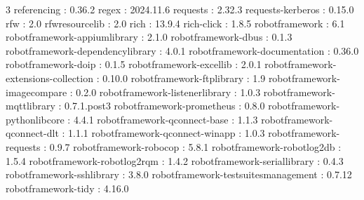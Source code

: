\begin{multicols}{3}
referencing : 0.36.2\newline
regex : 2024.11.6\newline
requests : 2.32.3\newline
requests-kerberos : 0.15.0\newline
rfw : 2.0\newline
rfwresourcelib : 2.0\newline
rich : 13.9.4\newline
rich-click : 1.8.5\newline
robotframework : 6.1\newline
robotframework-appiumlibrary : 2.1.0\newline
robotframework-dbus : 0.1.3\newline
robotframework-dependencylibrary : 4.0.1\newline
robotframework-documentation : 0.36.0\newline
robotframework-doip : 0.1.5\newline
robotframework-excellib : 2.0.1\newline
robotframework-extensions-collection : 0.10.0\newline
robotframework-ftplibrary : 1.9\newline
robotframework-imagecompare : 0.2.0\newline
robotframework-listenerlibrary : 1.0.3\newline
robotframework-mqttlibrary : 0.7.1.post3\newline
robotframework-prometheus : 0.8.0\newline
robotframework-pythonlibcore : 4.4.1\newline
robotframework-qconnect-base : 1.1.3\newline
robotframework-qconnect-dlt : 1.1.1\newline
robotframework-qconnect-winapp : 1.0.3\newline
robotframework-requests : 0.9.7\newline
robotframework-robocop : 5.8.1\newline
robotframework-robotlog2db : 1.5.4\newline
robotframework-robotlog2rqm : 1.4.2\newline
robotframework-seriallibrary : 0.4.3\newline
robotframework-sshlibrary : 3.8.0\newline
robotframework-testsuitesmanagement : 0.7.12\newline
robotframework-tidy : 4.16.0\newline

\end{multicols}
